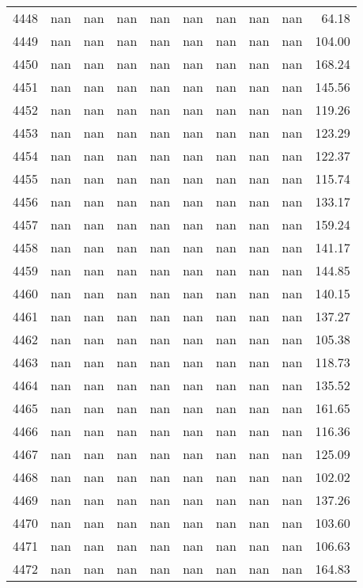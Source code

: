 \begin{tabular}{lrrrrrrrrr}
4448 & nan & nan & nan & nan & nan & nan & nan & nan & 64.18 \\
4449 & nan & nan & nan & nan & nan & nan & nan & nan & 104.00 \\
4450 & nan & nan & nan & nan & nan & nan & nan & nan & 168.24 \\
4451 & nan & nan & nan & nan & nan & nan & nan & nan & 145.56 \\
4452 & nan & nan & nan & nan & nan & nan & nan & nan & 119.26 \\
4453 & nan & nan & nan & nan & nan & nan & nan & nan & 123.29 \\
4454 & nan & nan & nan & nan & nan & nan & nan & nan & 122.37 \\
4455 & nan & nan & nan & nan & nan & nan & nan & nan & 115.74 \\
4456 & nan & nan & nan & nan & nan & nan & nan & nan & 133.17 \\
4457 & nan & nan & nan & nan & nan & nan & nan & nan & 159.24 \\
4458 & nan & nan & nan & nan & nan & nan & nan & nan & 141.17 \\
4459 & nan & nan & nan & nan & nan & nan & nan & nan & 144.85 \\
4460 & nan & nan & nan & nan & nan & nan & nan & nan & 140.15 \\
4461 & nan & nan & nan & nan & nan & nan & nan & nan & 137.27 \\
4462 & nan & nan & nan & nan & nan & nan & nan & nan & 105.38 \\
4463 & nan & nan & nan & nan & nan & nan & nan & nan & 118.73 \\
4464 & nan & nan & nan & nan & nan & nan & nan & nan & 135.52 \\
4465 & nan & nan & nan & nan & nan & nan & nan & nan & 161.65 \\
4466 & nan & nan & nan & nan & nan & nan & nan & nan & 116.36 \\
4467 & nan & nan & nan & nan & nan & nan & nan & nan & 125.09 \\
4468 & nan & nan & nan & nan & nan & nan & nan & nan & 102.02 \\
4469 & nan & nan & nan & nan & nan & nan & nan & nan & 137.26 \\
4470 & nan & nan & nan & nan & nan & nan & nan & nan & 103.60 \\
4471 & nan & nan & nan & nan & nan & nan & nan & nan & 106.63 \\
4472 & nan & nan & nan & nan & nan & nan & nan & nan & 164.83 \\

\end{tabular}
